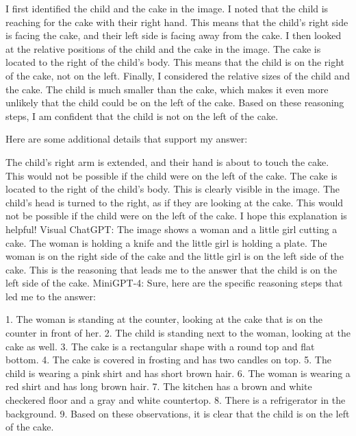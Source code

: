 \begin{enumerate}
        I first identified the child and the cake in the image.
        I noted that the child is reaching for the cake with their right hand. This means that the child's right side is facing the cake, and their left side is facing away from the cake.
        I then looked at the relative positions of the child and the cake in the image. The cake is located to the right of the child's body. This means that the child is on the right of the cake, not on the left.
        Finally, I considered the relative sizes of the child and the cake. The child is much smaller than the cake, which makes it even more unlikely that the child could be on the left of the cake.
        Based on these reasoning steps, I am confident that the child is not on the left of the cake.

        Here are some additional details that support my answer:

        The child's right arm is extended, and their hand is about to touch the cake. This would not be possible if the child were on the left of the cake.
        The cake is located to the right of the child's body. This is clearly visible in the image.
        The child's head is turned to the right, as if they are looking at the cake. This would not be possible if the child were on the left of the cake.
        I hope this explanation is helpful!
        \subitem Visual ChatGPT: The image shows a woman and a little girl cutting a cake. The woman is holding a knife and the little girl is holding a plate. The woman is on the right side of the cake and the little girl is on the left side of the cake. This is the reasoning that leads me to the answer that the child is on the left side of the cake.
        \subitem MiniGPT-4: Sure, here are the specific reasoning steps that led me to the answer:

        1. The woman is standing at the counter, looking at the cake that is on the counter in front of her.
        2. The child is standing next to the woman, looking at the cake as well.
        3. The cake is a rectangular shape with a round top and flat bottom.
        4. The cake is covered in frosting and has two candles on top.
        5. The child is wearing a pink shirt and has short brown hair.
        6. The woman is wearing a red shirt and has long brown hair.
        7. The kitchen has a brown and white checkered floor and a gray and white countertop.
        8. There is a refrigerator in the background.
        9. Based on these observations, it is clear that the child is on the left of the cake.
    \end{enumerate}

